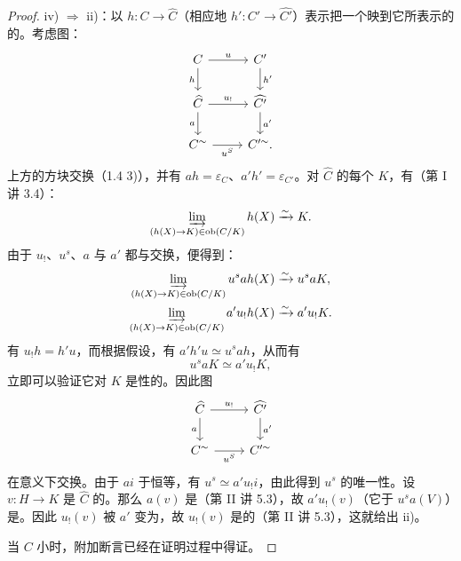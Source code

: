 \begin{proof}
\noindent iv) $\Rightarrow$ ii)：以 $h:C\to\widehat C$（相应地 $h':C'\to\widehat {C'}$）表示把一个映到它所表示的的。考虑图：
\[
\begin{tikzcd}
 C\arrow[r,"u"]\arrow[d,"h"'] & C'\arrow[d,"h'"]\\
 \widehat C\arrow[r,"u_!"]\arrow[d,"a"'] & \widehat {C'}\arrow[d,"a'"]\\
 C^{\sim}\arrow[r,"u^S"'] & C'^{\sim}.
\end{tikzcd}
\]
上方的方块交换（1.4 3)），并有 $ah=\varepsilon_C$、$a'h'=\varepsilon_{C'}$。对 $\widehat C$ 的每个 $K$，有（第 I 讲 3.4）：
\[
 \varinjlim_{(h(X)\to K)\in\operatorname{ob}(C/K)}h(X)\xrightarrow{\sim}K.
\]
由于 $u_!$、$u^s$、$a$ 与 $a'$ 都与交换，便得到：
\[
\begin{aligned}
 \varinjlim_{(h(X)\to K)\in\operatorname{ob}(C/K)}u^sa h(X)&\xrightarrow{\sim}u^saK,\\
 \varinjlim_{(h(X)\to K)\in\operatorname{ob}(C/K)}a'u_!h(X)&\xrightarrow{\sim}a'u_!K.
\end{aligned}
\]
有 $u_!h=h'u$，而根据假设，有 $a'h'u\simeq u^sah$，从而有
\[
 u^saK\simeq a'u_!K,
\]
立即可以验证它对 $K$ 是性的。因此图
\[
\begin{tikzcd}
 \widehat C\arrow[r,"u_!"]\arrow[d,"a"']&\widehat {C'}\arrow[d,"a'"]\\
 C^{\sim}\arrow[r,"u^S"']&C'^{\sim}
\end{tikzcd}
\]
在意义下交换。由于 $ai$ 于恒等，有 $u^s\simeq a'u_!i$，由此得到 $u^s$ 的唯一性。设 $v:H\to K$ 是 $\widehat C$ 的。那么 $a(v)$ 是（第 II 讲 5.3），故 $a'u_!(v)$（它于 $u^sa(V)$）是。因此 $u_!(v)$ 被 $a'$ 变为，故 $u_!(v)$ 是的（第 II 讲 5.3），这就给出 ii)。

当 $C$ 小时，附加断言已经在证明过程中得证。
\end{proof}

